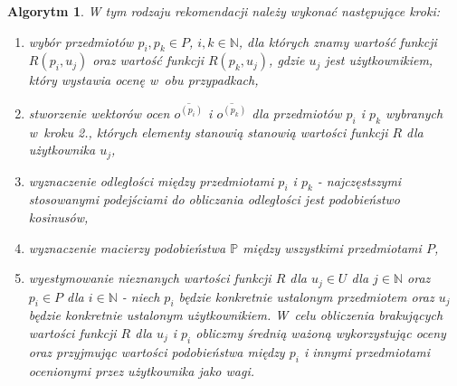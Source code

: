 \documentclass[12pt,a4paper]{report}
\newtheorem{algorytm}[df]{Algorytm}
\newcommand{\setN}{\mathbb{N}}
\newcommand{\setUzytkownicy}{\mathit{U}}
\newcommand{\setPrzedmioty}{\mathit{P}}
\begin{document}
\begin{algorytm}
W tym rodzaju rekomendacji należy wykonać następujące kroki:
\begin{enumerate}
\item wybór przedmiotów $p_i, p_k \in \setPrzedmioty$, $i,k \in \setN$, dla których znamy wartość funkcji $R(p_i,u_j)$ oraz wartość funkcji $R(p_k,u_j)$, gdzie $u_j$ jest użytkownikiem, który wystawia ocenę w~obu przypadkach,
\item stworzenie wektorów ocen $\overline{o^{(p_i)}}$ i $\overline{o^{(p_k)}}$ dla przedmiotów $p_i$ i $p_k$ wybranych w~kroku 2., których elementy stanowią stanowią wartości funkcji $R$ dla użytkownika $u_j$,
\item wyznaczenie odległości między przedmiotami $p_i$ i $p_k$ - najczęstszymi stosowanymi podejściami do obliczania odległości jest podobieństwo kosinusów,
\item wyznaczenie macierzy podobieństwa $\mathbb{P}$ między wszystkimi przedmiotami $\setPrzedmioty$,
\item wyestymowanie nieznanych wartości funkcji $R$ dla $u_j \in \setUzytkownicy$ dla $j \in \setN$ oraz $p_i \in \setPrzedmioty$ dla $i \in \setN$  - niech $p_i$ będzie konkretnie ustalonym przedmiotem oraz $u_j$ będzie konkretnie ustalonym użytkownikiem. W~celu obliczenia brakujących wartości funkcji $R$ dla $u_j$ i $p_i$ obliczmy średnią ważoną wykorzystując oceny oraz przyjmując wartości podobieństwa między $p_i$ i innymi przedmiotami ocenionymi przez użytkownika jako wagi.
\end{enumerate}
\end{algorytm}
\end{document}
